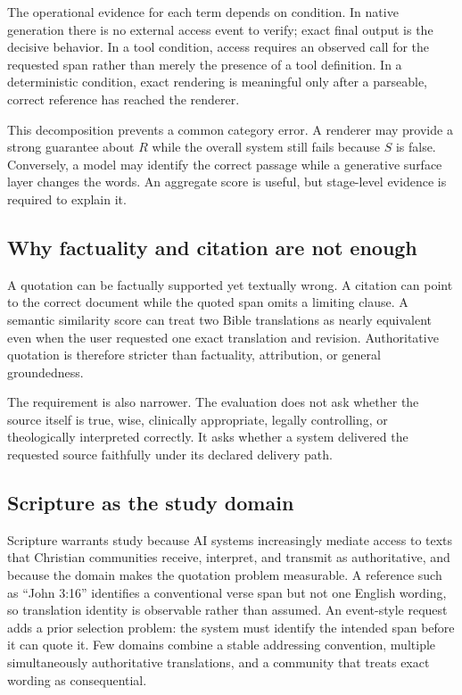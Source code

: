 \documentclass[11pt]{article}
\begin{document}
The operational evidence for each term depends on condition. In native
generation there is no external access event to verify; exact final output is
the decisive behavior. In a tool condition, access requires an observed call
for the requested span rather than merely the presence of a tool definition.
In a deterministic condition, exact rendering is meaningful only after a
parseable, correct reference has reached the renderer.

This decomposition prevents a common category error. A renderer may provide a
strong guarantee about $R$ while the overall system still fails because $S$ is
false. Conversely, a model may identify the correct passage while a generative
surface layer changes the words. An aggregate score is useful, but stage-level
evidence is required to explain it.

\subsection{Why factuality and citation are not enough}

A quotation can be factually supported yet textually wrong. A citation can
point to the correct document while the quoted span omits a limiting clause.
A semantic similarity score can treat two Bible translations as nearly
equivalent even when the user requested one exact translation and revision. Authoritative
quotation is therefore stricter than factuality, attribution, or general
groundedness.

The requirement is also narrower. The evaluation does not ask whether the source
itself is true, wise, clinically appropriate, legally controlling, or
theologically interpreted correctly. It asks whether a system delivered the
requested source faithfully under its declared delivery path.

\subsection{Scripture as the study domain}
\label{sec:scripture-domain}

Scripture warrants study because AI systems increasingly mediate access to
texts that Christian communities receive, interpret, and transmit as
authoritative, and because the domain makes the quotation problem measurable. A
reference such as ``John 3:16'' identifies a conventional verse span but not
one English wording, so translation identity is observable rather than assumed. An
event-style request adds a prior selection problem: the system must identify
the intended span before it can quote it. Few domains combine a stable
addressing convention, multiple simultaneously authoritative translations, and a
community that treats exact wording as consequential.
\end{document}
